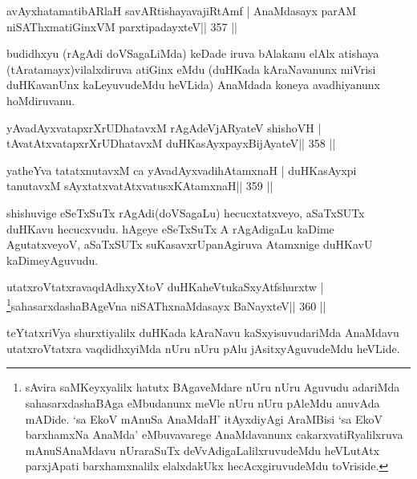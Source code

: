 \begin{shl}
avAyxhatamatibARlaH savARtishayavajiRtAmf |
AnaMdasayx parAM niSAThxmatiGinxVM parxtipadayxteV\hfill || 357 ||
\end{shl}

\begin{artha}
budidhxyu (rAgAdi doVSagaLiMda) keDade iruva bAlakanu elAlx atishaya (tAratamayx)vilalxdiruva atiGinx eMdu (duHKada kAraNavanunx miVrisi duHKavanUnx kaLeyuvudeMdu heVLida) AnaMdada koneya avadhiyanunx hoMdiruvanu.
\end{artha}


\begin{shl}
yAvadAyxvatapxrXrUDhatavxM rAgAdeVjARyateV shishoVH |
tAvatAtxvatapxrXrUDhatavxM duHKasAyxpayxBijAyateV\hfill || 358 ||
\end{shl}

\begin{shl}
yatheYva tatatxnutavxM ca yAvadAyxvadihA\s\s tamxnaH |
duHKasAyxpi tanutavxM sAyxtatxvatAtxvatusxKAtamxnaH\hfill || 359 ||
\end{shl}

\begin{artha}
shishuvige eSeTxSuTx rAgAdi(doVSagaLu) hecucxtatxveyo, aSaTxSUTx 
duHKavu hecucxvudu. hAgeye eSeTxSuTx A rAgAdigaLu kaDime AgutatxveyoV, 
aSaTxSUTx suKasavxrUpanAgiruva Atamxnige duHKavU kaDimeyAguvudu. 
\end{artha}



\begin{shl}
utatxroVtatxravaqdAdhxyX\s toV duHKaheVtukaSxyAtfshurxtw |
\footnote{sAvira saMKeyxyalilx hatutx BAgaveMdare nUru nUru 
Aguvudu adariMda sahasarxdashaBAga eMbudanunx meVle nUru nUru pAleMdu 
anuvAda mADide. `sa EkoV mAnuSa AnaMdaH' itAyxdiyAgi AraMBisi 
`sa EkoV barxhamxNa AnaMda' eMbuvavarege AnaMdavanunx 
cakarxvatiRyalilxruva mAnuSAnaMdavu nUraraSuTx deVvAdigaLalilxruvudeMdu heVLutAtx parxjApati barxhamxnalilx elalxdakUkx hecAcxgiruvudeMdu toVriside.}sahasarxdashaBAgeVna niSAThx\s\s naMdasayx BaNayxteV\hfill || 360 ||
\end{shl}

\begin{artha}
teYtatxriVya shurxtiyalilx duHKada kAraNavu kaSxyisuvudariMda AnaMdavu utatxroVtatxra vaqdidhxyiMda nUru nUru pAlu jAsitxyAguvudeMdu heVLide.
\end{artha}


